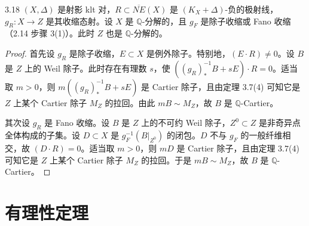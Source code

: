 \begin{corollaryp}{3.18}
$(X,\Delta)$ 是射影 klt 对，$R\subset\overline{NE}(X)$ 是 $(K_X+\Delta)$-负的极射线，$g_R:X\to Z$ 是其收缩态射。设 $X$ 是 $\mathbb{Q}$-分解的，且 $g_F$ 是除子收缩或 Fano 收缩（2.14 步骤 3(1)）。此时 $Z$ 也是 $\mathbb{Q}$-分解的。
\end{corollaryp}

\begin{proof}
首先设 $g_R$ 是除子收缩，$E\subset X$ 是例外除子。特别地，$(E\cdot R)\neq 0$。设 $B$ 是 $Z$ 上的 Weil 除子。此时存在有理数 $s$，使 $((g_R)_*^{-1}B+sE)\cdot R=0$。适当取 $m>0$，则 $m((g_R)_*^{-1}B+sE)$ 是 Cartier 除子，且由定理 3.7(4) 可知它是 $Z$ 上某个 Cartier 除子 $M_Z$ 的拉回。由此 $mB\sim M_Z$，故 $B$ 是 $\mathbb{Q}$-Cartier。

其次设 $g_R$ 是 Fano 收缩。设 $B$ 是 $Z$ 上的不可约 Weil 除子，$Z^0\subset Z$ 是非奇异点全体构成的子集。设 $D\subset X$ 是 $g_F^{-1}(B|_{Z^0})$ 的闭包。$D$ 不与 $g_F$ 的一般纤维相交，故 $(D\cdot R)=0$。适当取 $m>0$，则 $mD$ 是 Cartier 除子，且由定理 3.7(4) 可知它是 $Z$ 上某个 Cartier 除子 $M_Z$ 的拉回。于是 $mB\sim M_Z$，故 $B$ 是 $\mathbb{Q}$-Cartier。
\end{proof}

\section{有理性定理}

